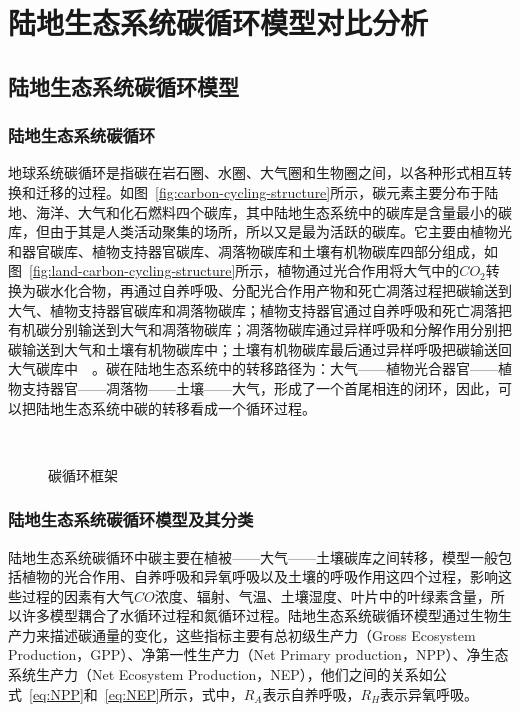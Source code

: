 \chapter{陆地生态系统碳循环模型对比分析}
\label{chap:model}

\section{陆地生态系统碳循环模型}
\label{sec:model}
\subsection{陆地生态系统碳循环}
地球系统碳循环是指碳在岩石圈、水圈、大气圈和生物圈之间，以各种形式相互转换和迁移的过程。如图~\ref{fig:carbon-cycling-structure}所示，碳元素主要分布于陆地、海洋、大气和化石燃料四个碳库，其中陆地生态系统中的碳库是含量最小的碳库，但由于其是人类活动聚集的场所，所以又是最为活跃的碳库。它主要由植物光和器官碳库、植物支持器官碳库、凋落物碳库和土壤有机物碳库四部分组成，如图~\ref{fig:land-carbon-cycling-structure}所示，植物通过光合作用将大气中的$CO_2$转换为碳水化合物，再通过自养呼吸、分配光合作用产物和死亡凋落过程把碳输送到大气、植物支持器官碳库和凋落物碳库；植物支持器官通过自养呼吸和死亡凋落把有机碳分别输送到大气和凋落物碳库；凋落物碳库通过异样呼吸和分解作用分别把碳输送到大气和土壤有机物碳库中；土壤有机物碳库最后通过异样呼吸把碳输送回大气碳库中~\cite{2004-esc}~\cite{2006-maoliuxi}。碳在陆地生态系统中的转移路径为：大气——植物光合器官——植物支持器官——凋落物——土壤——大气，形成了一个首尾相连的闭环，因此，可以把陆地生态系统中碳的转移看成一个循环过程。

\begin{figure}[!htbp]
    \centering
    \hfill
     \\
    \caption{碳循环框架}
    \label{fig:carbon-cycling}
\end{figure}

\subsection{陆地生态系统碳循环模型及其分类}
陆地生态系统碳循环中碳主要在植被——大气——土壤碳库之间转移，模型一般包括植物的光合作用、自养呼吸和异氧呼吸以及土壤的呼吸作用这四个过程，影响这些过程的因素有大气$CO$浓度、辐射、气温、土壤湿度、叶片中的叶绿素含量，所以许多模型耦合了水循环过程和氮循环过程。陆地生态系统碳循环模型通过生物生产力来描述碳通量的变化，这些指标主要有总初级生产力（Gross Ecosystem Production，GPP）、净第一性生产力（Net Primary production，NPP）、净生态系统生产力（Net Ecosystem Production，NEP），他们之间的关系如公式~\ref{eq:NPP}和~\ref{eq:NEP}所示，式中，$R_A$表示自养呼吸，$R_H$表示异氧呼吸。

